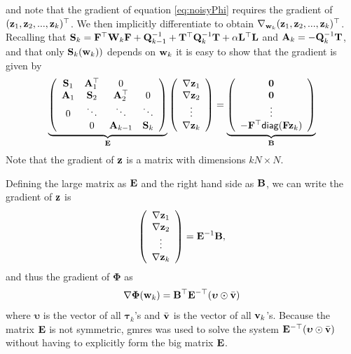 \documentclass[11pt]{article}
\newcommand{\bfA}	{{\bf{A}}}
\newcommand{\bfB}	{{\bf{B}}}
\newcommand{\bfE}	{{\bf{E}}}
\newcommand{\bfF}	{{\bf{F}}}
\newcommand{\bfL}	{{\bf{L}}}
\newcommand{\bfQ}	{{\bf{Q}}}
\newcommand{\bfS}	{{\bf{S}}}
\newcommand{\bfT}	{{\bf{T}}}
\newcommand{\bfW}	{{\bf{W}}}
\newcommand{\bfv}	{{\bf{v}}}
\newcommand{\bfw}	{{\bf{w}}}
\newcommand{\bfz}	{{\bf{z}}}
\newcommand{\bfPhi}     {{\boldsymbol \Phi}}
\newcommand{\bftau}      {{\boldsymbol \tau}}
\newcommand{\bfupsilon}      {{\boldsymbol \upsilon}}
\newcommand{\LtL}       { \bfL^{\top}\bfL}
\newcommand {\zero}  { {\bf 0} }
\newcommand{\grad}	{\ensuremath {{\bf{ \nabla}}}}
\begin{document}
and note that the gradient of equation \eqref{eq:noisyPhi} requires the gradient of $(\bfz_1,\bfz_2,...,\bfz_k)^{\top}$. We then implicitly differentiate to obtain $\nabla_{\bfw_k} (\bfz_1,\bfz_2,...,\bfz_k)^{\top}$. Recalling that $\bfS_k = \bfF^{\top}\bfW_{k}\bfF + \bfQ^{-1}_{k-1} + \bfT^{\top}\bfQ^{-1}_{k}\bfT +\alpha\LtL$  and $\bfA_k = -\bfQ^{-1}_k \bfT$, and that only $\bfS_k(\bfw_k))$ depends on $\bfw_k$ it is easy to show that the gradient is given by 
\begin{equation}
\label{eq:gradSys}
\underbrace{\left(\begin{array}{cccc}
 \bfS_1 &  \bfA^{\top}_1 & 0 & \\
 \bfA_1 & \bfS_2 & \bfA^{\top}_2 & 0 \\
 0 & \ddots & \ddots & \ddots \\
 & 0 & \bfA_{k-1} & \bfS_k
  \end{array}\right)}_{\bfE}
  \left(\begin{array}{c} \grad\bfz_1 \\ \grad\bfz_2\\ \vdots\\ \grad\bfz_k \end{array}\right)
  =
  \underbrace{\left(\begin{array}{c} \zero \\ \zero\\ \vdots\\ -\bfF^{\top}{\sf diag}(\bfF\bfz_k) \end{array}\right)}_{\bfB}
\end{equation}
Note that the gradient of $\bfz$ is a matrix with dimensions $kN\times  N$. 

Defining the large matrix as $\bfE$ and the right hand side as $\bfB$, we can write the gradient of $\bfz$ is 
\begin{equation}
\left(\begin{array}{c} \grad\bfz_1 \\ \grad\bfz_2\\ \vdots\\ \grad\bfz_k \end{array}\right) = \bfE^{-1}\bfB,
\end{equation}
and thus the gradient of $\bfPhi$ as
\begin{equation}
\nabla \bfPhi(\bfw_k) = \bfB^{\top}\bfE^{- \top}(\bfupsilon \odot \bar{\bfv})
\end{equation}
where $\bfupsilon$ is the vector of all $\bftau_k$'s and $\bar{\bfv}$ is the vector of all $\bfv_k$'s.
Because the matrix $\bfE$ is not symmetric, gmres was used to solve the system $\bfE^{-\top}(\bfupsilon \odot \bar{\bfv})$ without having to explicitly form the big matrix $\bfE$.
 
\end{document}
